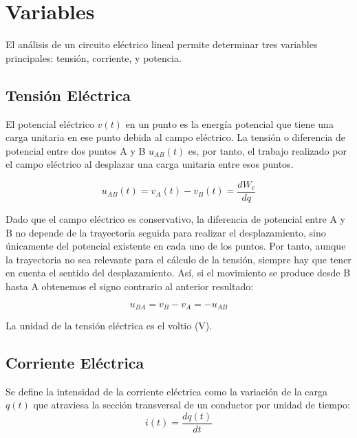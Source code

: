 \chapter{Variables}
\label{cha:variables}
El análisis de un circuito eléctrico lineal permite determinar tres variables principales: tensión, corriente, y potencia.

\section{Tensión Eléctrica}
\label{sec:tension}

El potencial eléctrico $v(t)$ en un punto es la energía potencial que tiene una carga unitaria en ese punto debida al campo eléctrico. La tensión o diferencia de potencial entre dos puntos A y B $u_{AB}(t)$ es, por tanto, el trabajo realizado por el campo eléctrico al desplazar una carga unitaria entre esos puntos. 


\begin{equation}
  \label{eq:uab}
  u_{AB}(t) = v_A(t) - v_B(t) = \frac{dW_{e}}{dq}
\end{equation}

Dado que el campo eléctrico es conservativo, la diferencia de potencial entre A y B no depende de la trayectoria seguida para realizar el desplazamiento, sino únicamente del potencial existente en cada uno de los puntos. Por tanto, aunque la trayectoria no sea relevante para el cálculo de la tensión, siempre hay que tener en cuenta el sentido del desplazamiento. Así, si el movimiento se produce desde B hasta A obtenemos el signo contrario al anterior resultado:


\begin{equation}
  \label{eq:signo_tension}
  u_{BA} = v_B - v_A = - u_{AB} 
\end{equation}

La unidad de la tensión eléctrica es el voltio (V).
\section{Corriente Eléctrica}
\label{sec:corriente}

Se define la intensidad de la corriente eléctrica como la variación de la carga $q(t)$ que atraviesa la sección transversal de un conductor por unidad de tiempo:
\begin{equation}
  \label{eq:corriente}
  i(t)=\frac{dq(t)}{dt}
\end{equation}

